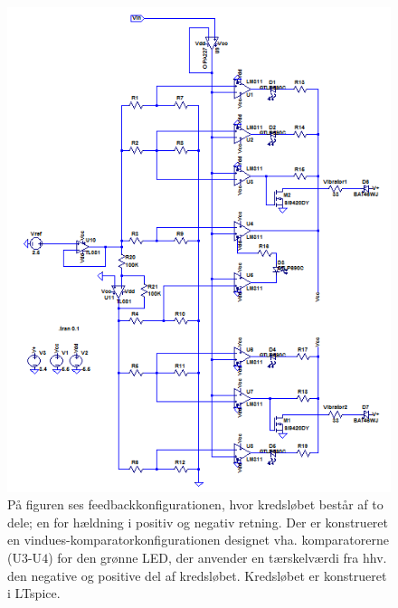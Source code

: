 \begin{figure}[H] 
	\centering
	\includegraphics[scale=0.7]{figures/cProblemloesning/komparator_uden_vaerdi.PNG}
	\caption{På figuren ses feedbackkonfigurationen, hvor kredsløbet består af to dele; en for hældning i positiv og negativ retning. Der er konstrueret en vindues-komparatorkonfigurationen designet vha. komparatorerne (U$3$-U$4$) for den grønne LED, der anvender en tærskelværdi fra hhv. den negative og positive del af kredsløbet. Kredsløbet er konstrueret i LTspice.}
	\label{fig:komparator_uden_vaerdi}
\end{figure}


